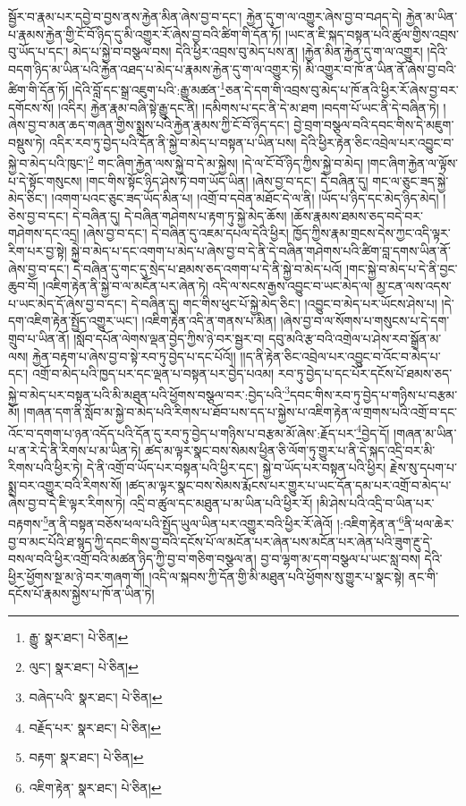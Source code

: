 སྦྱོར་བ་རྣམ་པར་དབྱེ་བ་བྱས་ནས་རྐྱེན་མིན་ཞེས་བྱ་བ་དང་། རྐྱེན་དུ་ག་ལ་འགྱུར་ཞེས་བྱ་བ་བཤད་དེ། རྐྱེན་མ་ཡིན་པ་རྣམས་རྐྱེན་གྱི་ངོ་བོ་ཉིད་དུ་མི་འགྱུར་རོ་ཞེས་བྱ་བའི་ཚིག་གི་དོན་ཏོ། །ཡང་ན་ཇི་སྐད་བསྟན་པའི་ཚུལ་གྱིས་འབྲས་བུ་ཡོད་པ་དང་། མེད་པ་སྐྱེ་བ་བསྩལ་བས། དེའི་ཕྱིར་འབྲས་བུ་མེད་པས་ན། །རྐྱེན་མིན་རྐྱེན་དུ་ག་ལ་འགྱུར། །དེའི་བདག་ཉིད་མ་ཡིན་པའི་རྐྱེན་འཐད་པ་མེད་པ་རྣམས་རྐྱེན་དུ་ག་ལ་འགྱུར་ཏེ། མི་འགྱུར་བ་ཁོ་ན་ཡིན་ནོ་ཞེས་བྱ་བའི་ཚིག་གི་དོན་ཏོ། །དེའི་བློ་དང་སྒྲ་འཇུག་པའི་:རྒྱུ་མཚན་\footnote{རྒྱུ་  སྣར་ཐང་།  པེ་ཅིན། }ཅན་དེ་དག་གི་འབྲས་བུ་མེད་པ་ཁོ་ནའི་ཕྱིར་རོ་ཞེས་བྱ་བར་དགོངས་སོ། །འདིར། རྐྱེན་རྣམ་བཞི་སྟེ་རྒྱུ་དང་ནི། །དམིགས་པ་དང་ནི་དེ་མ་ཐག །བདག་པོ་ཡང་ནི་དེ་བཞིན་ཏེ། །ཞེས་བྱ་བ་མན་ཆད་གཞན་གྱིས་སྨྲས་པའི་རྐྱེན་རྣམས་ཀྱི་ངོ་བོ་ཉིད་དང་། བྱེ་བྲག་བསྩལ་བའི་དབང་གིས་དེ་མཇུག་བསྡུས་ཏེ། འདིར་རབ་ཏུ་བྱེད་པའི་དོན་ནི་སྐྱེ་བ་མེད་པ་བསྟན་པ་ཡིན་པས། དེའི་ཕྱིར་རྟེན་ཅིང་འབྲེལ་པར་འབྱུང་བ་སྐྱེ་བ་མེད་པའི་ཁུང་།\footnote{ལུང་།  སྣར་ཐང་།  པེ་ཅིན། } གང་ཞིག་རྐྱེན་ལས་སྐྱེ་བ་དེ་མ་སྐྱེས། །དེ་ལ་ངོ་བོ་ཉིད་ཀྱིས་སྐྱེ་བ་མེད། །གང་ཞིག་རྐྱེན་ལ་ལྟོས་པ་དེ་སྟོང་གསུངས། །གང་གིས་སྟོང་ཉིད་ཤེས་ཏེ་བག་ཡོད་ཡིན། །ཞེས་བྱ་བ་དང་། དེ་བཞིན་དུ། གང་ལ་ཅུང་ཟད་སྐྱེ་མེད་ཅིང་། །འགག་པའང་ཅུང་ཟད་ཡོད་མིན་པ། །འགྲོ་བ་དབེན་མཐོང་དེ་ལ་ནི། །ཡོད་པ་ཉིད་དང་མེད་ཉིད་མེད། །ཅེས་བྱ་བ་དང་། དེ་བཞིན་དུ། དེ་བཞིན་གཤེགས་པ་རྟག་ཏུ་སྐྱེ་མེད་ཆོས། །ཆོས་རྣམས་ཐམས་ཅད་བདེ་བར་གཤེགས་དང་འདྲ། །ཞེས་བྱ་བ་དང་། དེ་བཞིན་དུ་འཇམ་དཔལ་དེའི་ཕྱིར། ཁྱོད་ཀྱིས་རྣམ་གྲངས་དེས་ཀྱང་འདི་ལྟར་རིག་པར་བྱ་སྟེ། སྐྱེ་བ་མེད་པ་དང་འགག་པ་མེད་པ་ཞེས་བྱ་བ་དེ་ནི་དེ་བཞིན་གཤེགས་པའི་ཚིག་བླ་དགས་ཡིན་ནོ་ཞེས་བྱ་བ་དང་། དེ་བཞིན་དུ་གང་དུ་སྲེད་པ་ཐམས་ཅད་འགག་པ་དེ་ནི་སྐྱེ་བ་མེད་པའོ། །གང་སྐྱེ་བ་མེད་པ་དེ་ནི་བྱང་ཆུབ་བོ། །འཇིག་རྟེན་ནི་སྐྱེ་བ་ལ་མངོན་པར་ཞེན་ཏེ། འདི་ལ་སངས་རྒྱས་འབྱུང་བ་ཡང་མེད་ལ། མྱ་ངན་ལས་འདས་པ་ཡང་མེད་དོ་ཞེས་བྱ་བ་དང་། དེ་བཞིན་དུ། གང་གིས་ཕུང་པོ་སྐྱེ་མེད་ཅིང་། །འབྱུང་བ་མེད་པར་ཡོངས་ཤེས་པ། །དེ་དག་འཇིག་རྟེན་སྤྱོད་འགྱུར་ཡང་། །འཇིག་རྟེན་འདི་ན་གནས་པ་མིན། །ཞེས་བྱ་བ་ལ་སོགས་པ་གསུངས་པ་དེ་དག་གྲུབ་པ་ཡིན་ནོ། །སློབ་དཔོན་ལེགས་ལྡན་བྱེད་ཀྱིས་ཉེ་བར་སྦྱར་བ། དབུ་མའི་རྩ་བའི་འགྲེལ་པ་ཤེས་རབ་སྒྲོན་མ་ལས། རྐྱེན་བརྟག་པ་ཞེས་བྱ་བ་སྟེ་རབ་ཏུ་བྱེད་པ་དང་པོའོ།། །།ད་ནི་རྟེན་ཅིང་འབྲེལ་པར་འབྱུང་བ་འོང་བ་མེད་པ་དང་། འགྲོ་བ་མེད་པའི་ཁྱད་པར་དང་ལྡན་པ་བསྟན་པར་བྱེད་པའམ། རབ་ཏུ་བྱེད་པ་དང་པོར་དངོས་པོ་ཐམས་ཅད་སྐྱེ་བ་མེད་པར་བསྟན་པའི་མི་མཐུན་པའི་ཕྱོགས་བསྩལ་བར་:བྱེད་པའི་\footnote{བཞེད་པའི་  སྣར་ཐང་།  པེ་ཅིན། }དབང་གིས་རབ་ཏུ་བྱེད་པ་གཉིས་པ་བརྩམ་མོ། །གཞན་དག་ནི་སློབ་མ་སྐྱེ་བ་མེད་པའི་རིགས་པ་ཐོབ་པས་དད་པ་སྐྱེས་པ་འཇིག་རྟེན་ལ་གྲགས་པའི་འགྲོ་བ་དང་འོང་བ་དགག་པ་ཉན་འདོད་པའི་དོན་དུ་རབ་ཏུ་བྱེད་པ་གཉིས་པ་བརྩམ་མོ་ཞེས་:རྗོད་པར་\footnote{བརྗོད་པར་  སྣར་ཐང་།  པེ་ཅིན། }བྱེད་དོ། །གཞན་མ་ཡིན་པ་ན་རེ་དེ་ནི་རིགས་པ་མ་ཡིན་ཏེ། ཚད་མ་ལྟར་སྣང་བས་སེམས་ཕྱིན་ཅི་ལོག་ཏུ་གྱུར་པ་ནི་དེ་སྐད་འདྲི་བར་མི་རིགས་པའི་ཕྱིར་ཏེ། དེ་ནི་འགྲོ་བ་ཡོད་པར་བསྟན་པའི་ཕྱིར་དང་། སྐྱེ་བ་ཡོད་པར་བསྟན་པའི་ཕྱིར། རྗེས་སུ་དཔག་པ་སྨྲ་བར་འགྱུར་བའི་རིགས་སོ། །ཚད་མ་ལྟར་སྣང་བས་སེམས་རྨོངས་པར་གྱུར་པ་ཡང་དོན་དམ་པར་འགྲོ་བ་མེད་པ་ཞེས་བྱ་བ་དེ་ཇི་ལྟར་རིགས་ཏེ། འདྲི་བ་ཚུལ་དང་མཐུན་པ་མ་ཡིན་པའི་ཕྱིར་རོ། །མི་ཤེས་པའི་འདྲི་བ་ཡིན་པར་བརྟགས་\footnote{བརྟག་  སྣར་ཐང་།  པེ་ཅིན། }ན་ནི་བསྟན་བཅོས་ཕལ་པའི་སྤྱོད་ཡུལ་ཡིན་པར་འགྱུར་བའི་ཕྱིར་རོ་ཞེའོ། །:འཇིག་རྟེན་ན་\footnote{འཇིག་རྟེན་  སྣར་ཐང་།  པེ་ཅིན། }ནི་ཕལ་ཆེར་བྱ་བ་མང་པོའི་ཐ་སྙད་ཀྱི་དབང་གིས་བྱ་བའི་དངོས་པོ་ལ་མངོན་པར་ཞེན་པས་མངོན་པར་ཞེན་པའི་ཟུག་རྔུ་དེ་བསལ་བའི་ཕྱིར་འགྲོ་བའི་མཚན་ཉིད་ཀྱི་བྱ་བ་གཅིག་བསྩལ་ན། བྱ་བ་ལྷག་མ་དག་བསྩལ་པ་ཡང་སླ་བས། དེའི་ཕྱིར་ཕྱོགས་སྔ་མ་ཉེ་བར་གཞག་གོ། །འདི་ལ་སྐབས་ཀྱི་དོན་གྱི་མི་མཐུན་པའི་ཕྱོགས་སུ་གྱུར་པ་སྣང་སྟེ། ནང་གི་དངོས་པོ་རྣམས་སྐྱེས་པ་ཁོ་ན་ཡིན་ཏེ། 